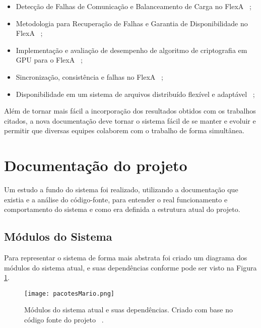         \begin{itemize}
            \item Detecção de Falhas de Comunicação e Balanceamento de Carga no FlexA ~\cite{danilo};
            \item Metodologia para Recuperação de Falhas e Garantia de Disponibilidade no FlexA ~\cite{thiago};
            \item Implementação e avaliação de desempenho de algoritmo de criptografia em GPU para o FlexA ~\cite{leandro};
            \item Sincronização, consistência e falhas no FlexA ~\cite{matheus};
            \item Disponibilidade em um sistema de arquivos distribuído flexível e adaptável ~\cite{lucio};
        \end{itemize}
        
       
    Além de tornar mais fácil a incorporação dos resultados obtidos com os trabalhos citados, a nova documentação deve tornar o sistema fácil de se manter e evoluir e permitir que diversas equipes colaborem com o trabalho de forma simultânea.
    
    
    
        
    \section{Documentação do projeto}
        
    Um estudo a fundo do sistema foi realizado, utilizando a documentação que existia e a análise do código-fonte, para entender o real funcionamento e comportamento do sistema e como era definida a estrutura atual do projeto. 
    
    \subsection{Módulos do Sistema}
    
        Para representar o sistema de forma mais abstrata foi criado um diagrama dos módulos do sistema atual, e suas dependências conforme pode ser visto na Figura \ref{fig:pacotesMario}.
        
        \begin{figure}[!ht]
            \centering
            \texttt{[image: pacotesMario.png]}
            \caption{Módulos do sistema atual e suas dependências. Criado com base no código fonte do projeto ~\cite{mario}.}
            \label{fig:pacotesMario}
        \end{figure}
        
